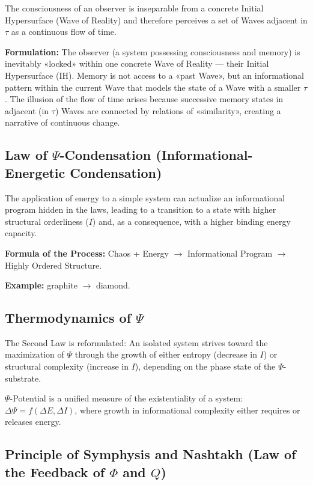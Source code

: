 \documentclass[a4paper,12pt]{article}
\begin{document}
	The consciousness of an observer is inseparable from a concrete Initial Hypersurface (Wave of Reality) and therefore perceives a set of Waves adjacent in $\tau$ as a continuous flow of time.
	
	\textbf{Formulation:} The observer (a system possessing consciousness and memory) is inevitably «locked» within one concrete Wave of Reality — their Initial Hypersurface (IH). Memory is not access to a «past Wave», but an informational pattern within the current Wave that models the state of a Wave with a smaller $\tau$. The illusion of the flow of time arises because successive memory states in adjacent (in $\tau$) Waves are connected by relations of «similarity», creating a narrative of continuous change.
	
	\subsection{Law of $\Psi$-Condensation (Informational-Energetic Condensation)}
	
	The application of energy to a simple system can actualize an informational program hidden in the laws, leading to a transition to a state with higher structural orderliness ($I$) and, as a consequence, with a higher binding energy capacity.
	
	\textbf{Formula of the Process:} Chaos + Energy $\to$ Informational Program $\to$ Highly Ordered Structure.
	
	\textbf{Example:} graphite $\to$ diamond.
	
	\subsection{Thermodynamics of $\Psi$}
	
	The Second Law is reformulated: An isolated system strives toward the maximization of $\Psi$ through the growth of either entropy (decrease in $I$) or structural complexity (increase in $I$), depending on the phase state of the $\Psi$-substrate.
	
	$\Psi$-Potential is a unified measure of the existentiality of a system: $\Delta\Psi = f(\Delta E, \Delta I)$, where growth in informational complexity either requires or releases energy.
	
	\subsection{Principle of Symphysis and Nashtakh (Law of the Feedback of $\Phi$ and $Q$)}
	
\end{document}
